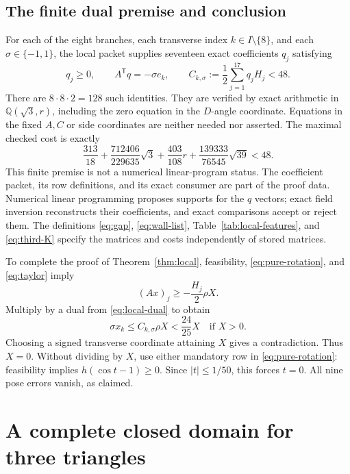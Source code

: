 \documentclass[11pt]{article}
\begin{document}
\subsection{The finite dual premise and conclusion}

For each of the eight branches, each transverse index $k\in I\setminus\{8\}$, and each $\sigma\in\{-1,1\}$, the local packet supplies seventeen exact coefficients $q_j$ satisfying
\begin{equation}\label{eq:local-dual}
 q_j\ge0,\qquad A^{\mathsf T}q=-\sigma e_k,
 \qquad C_{k,\sigma}:=\frac12\sum_{j=1}^{17}q_jH_j<48.
\end{equation}
There are $8\cdot8\cdot2=128$ such identities. They are verified by exact arithmetic in $\mathbb Q(\sqrt3,r)$, including the zero equation in the $D$-angle coordinate. Equations in the fixed $A,C$ or side coordinates are neither needed nor asserted. The maximal checked cost is exactly
\begin{equation}\label{eq:maximum-dual}
 \frac{313}{18}+\frac{712406}{229635}\sqrt3
 +\frac{403}{108}r+\frac{139333}{76545}\sqrt{39}<48.
\end{equation}
This finite premise is not a numerical linear-program status. The coefficient packet, its row definitions, and its exact consumer are part of the proof data. Numerical linear programming proposes supports for the $q$ vectors; exact field inversion reconstructs their coefficients, and exact comparisons accept or reject them. The definitions \eqref{eq:gap}, \eqref{eq:wall-list}, Table~\ref{tab:local-features}, and \eqref{eq:third-K} specify the matrices and costs independently of stored matrices.

To complete the proof of Theorem~\ref{thm:local}, feasibility, \eqref{eq:pure-rotation}, and \eqref{eq:taylor} imply
\[
 (Ax)_j\ge-\frac{H_j}2\rho X.
\]
Multiply by a dual from \eqref{eq:local-dual} to obtain
\[
 \sigma x_k\le C_{k,\sigma}\rho X<\frac{24}{25}X
 \quad\text{if }X>0.
\]
Choosing a signed transverse coordinate attaining $X$ gives a contradiction. Thus $X=0$. Without dividing by $X$, use either mandatory row in \eqref{eq:pure-rotation}: feasibility implies $h(\cos t-1)\ge0$. Since $|t|\le1/50$, this forces $t=0$. All nine pose errors vanish, as claimed.

\section{A complete closed domain for three triangles}\label{sec:domain}
\end{document}
